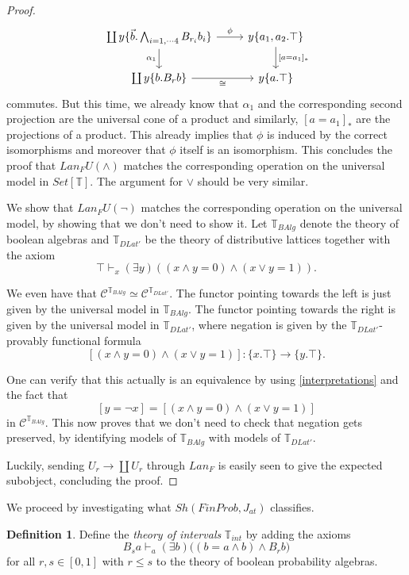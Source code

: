\documentclass[a4paper]{amsproc}
\theoremstyle{plain}
\theoremstyle{definition}
\newtheorem{definition}{Definition}[section]
\theoremstyle{remark}
\numberwithin{equation}{section}
\begin{document}
\begin{proof}
\[
\begin{tikzcd}
{\coprod y \{\vec{b}.\bigwedge_{i=1,\cdots 4} B_{r_i} b_i\}} \arrow[d, "\alpha_1"'] \arrow[r, "\phi"] & {y \{a_1,a_2.\top\}} \arrow[d, "{[a = a_1]_*}"] \\
\coprod y \{b.B_rb\} \arrow[r, "\cong"']                                                            & y\{a.\top\}
\end{tikzcd}
\]
commutes. But this time, we already know that $\alpha_1$ and the corresponding second projection are the universal cone of a product and similarly, $[a=a_1]_*$ are the projections of a product. This already implies that $\phi$ is induced by the correct isomorphisms and moreover that $\phi$ itself is an isomorphism. This concludes the proof that $Lan_F U(\wedge)$ matches the corresponding operation on the universal model in $Set[\mathbb{T}]$. The argument for $\vee$ should be very similar.

We show that $Lan_F U(\neg)$ matches the corresponding operation on the universal model, by showing that we don't need to show it. Let $\mathbb{T}_{BAlg}$ denote the theory of boolean algebras and $\mathbb{T}_{DLat'}$ be the theory of distributive lattices together with the axiom
\[
\top \vdash_{x} (\exists y) ((x \wedge y=0)\wedge (x\vee y=1)) .
\]

We even have that $\mathcal{C}^{\mathbb{T}_{BAlg}} \simeq \mathcal{C}^{\mathbb{T}_{DLat'}}$. The functor pointing towards the left is just given by the universal model in $\mathbb{T}_{BAlg}$. The functor pointing towards the right is given by the universal model in $\mathbb{T}_{DLat'}$, where negation is given by the $\mathbb{T}_{DLat'}$-provably functional formula
\[
[(x\wedge y=0) \wedge (x\vee y=1)] : \{x.\top\} \to \{y.\top\}  .
\]

One can verify that this actually is an equivalence by using \ref{interpretations} and the fact that
\[
[y=\neg x] = [(x\wedge y=0) \wedge (x\vee y=1)] 
\]
in $\mathcal{C}^{\mathbb{T}_{BAlg}}$. This now proves that we don't need to check that negation gets preserved, by identifying models of $\mathbb{T}_{BAlg}$ with models of $\mathbb{T}_{DLat'}$.

Luckily, sending $U_r \to \coprod U_r$ through $Lan_F$ is easily seen to give the expected subobject, concluding the proof.
\end{proof}

We proceed by investigating what $Sh(FinProb, J_{at})$ classifies.

\begin{definition}
Define the \textit{theory of intervals} $\mathbb{T}_{int}$ by adding the axioms
\[
B_s a \vdash_a (\exists b) \big ( (b = a \wedge b) \wedge B_r b \big )
\]
for all $r,s \in [0,1]$ with $r \leq s$ to the theory of boolean probability algebras.
\end{definition}
\end{document}
